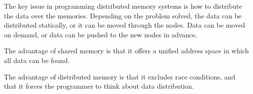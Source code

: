\documentclass[12pt]{article}
\begin{document}
The key issue in programming distributed memory systems is how to distribute the data over the memories. Depending on the problem solved, the data can be distributed statically, or it can be moved through the nodes. Data can be moved on demand, or data can be pushed to the new nodes in advance. 

The advantage of shared memory is that it offers a unified address space in which all data can be found.

The advantage of distributed memory is that it excludes race conditions, and that it forces the programmer to think about data distribution.




%
%
\end{document}
